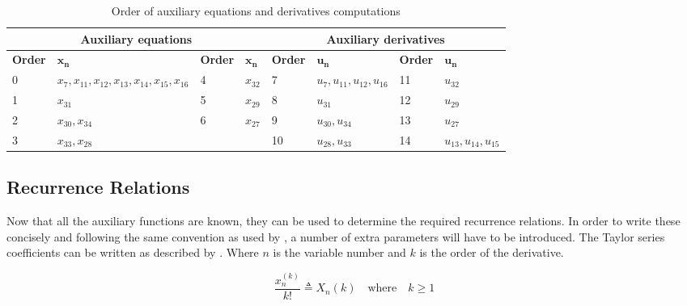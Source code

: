 \begin{table}[H]
\begin{center}
\caption{Order of auxiliary equations and derivatives computations}
\label{tab:calcOrderAuxEq}
\begin{tabular}{|l|l||l|l||l|l||l|l|}
\hline 
\multicolumn{4}{c}{\textbf{Auxiliary equations}} & \multicolumn{4}{c}{\textbf{Auxiliary derivatives}} \\ \hline \hline
\textbf{Order} & $\mathbf{x_{n}}$ &\textbf{Order} & $\mathbf{x_{n}}$ & \textbf{Order} & $\mathbf{u_{n}}$ & \textbf{Order} & $\mathbf{u_{n}}$ \\ \hline 
0 & $ x_{7} ,x_{11}, x_{12}, x_{13}, x_{14}, x_{15}, x_{16} $ & 4 & $ x_{32}$ & 7 & $ u_{7}, u_{11}, u_{12}, u_{16} $ & 11 & $ u_{32} $  \\ \hline
1 & $ x_{31} $ & 5 & $ x_{29} $  & 8 & $u_{31}$ &  12 &  $ u_{29} $ \\ \hline
2 & $ x_{30}, x_{34}$ & 6 & $ x_{27} $  & 9 & $ u_{30}, u_{34} $ &  13 & $ u_{27} $ \\ \hline
3 & $ x_{33}, x_{28} $ &   &  & 10 & $ u_{28}, u_{33} $ &  14 &  $ u_{13}, u_{14}, u_{15} $\\ \hline


\end{tabular}
\end{center}
\end{table}





%
%



\subsection{Recurrence Relations}
\label{subsec:recRel}
Now that all the auxiliary functions are known, they can be used to determine the required recurrence relations. In order to write these concisely and following the same convention as used by \cite{scott2008high}, a number of extra parameters will have to be introduced. The Taylor series coefficients can be written as described by . Where $n$ is the variable number and $k$ is the order of the derivative.

\begin{equation} \label{eq:tsCoeff}
\dfrac{x_{n}^{\left(k\right)}}{k!} \triangleq X_{n}\left(k\right) \quad \text{where} \quad k \geq 1
\end{equation}

